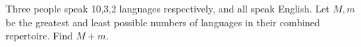 Three people speak 10,3,2 languages respectively, and all speak English. Let $ M,m $ be the greatest and least possible numbers of languages in their combined repertoire. Find $ M+m $.

